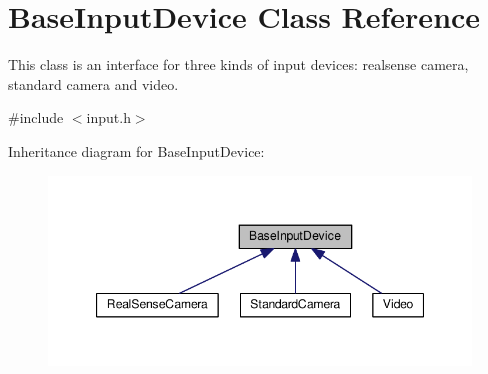 \hypertarget{classBaseInputDevice}{}\section{Base\+Input\+Device Class Reference}
\label{classBaseInputDevice}


This class is an interface for three kinds of input devices\+: realsense camera, standard camera and video.  




{\ttfamily \#include $<$input.\+h$>$}



Inheritance diagram for Base\+Input\+Device\+:
\nopagebreak
\begin{figure}[H]
\begin{center}
\leavevmode
\includegraphics[width=347pt]{classBaseInputDevice__inherit__graph}
\end{center}
\end{figure}
